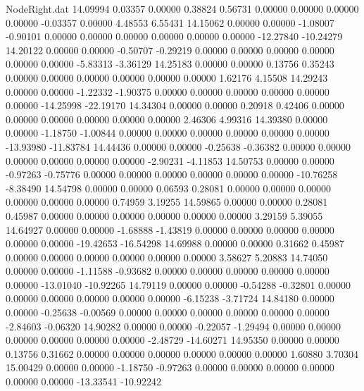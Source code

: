 \begin{filecontents}{NodeRight.dat}
  14.09994    0.03357    0.00000     0.38824    0.56731    0.00000    0.00000    0.00000    0.00000   -0.03357    0.00000    4.48553    6.55431
  14.15062    0.00000    0.00000    -1.08007   -0.90101    0.00000    0.00000    0.00000    0.00000    0.00000    0.00000  -12.27840  -10.24279
  14.20122    0.00000    0.00000    -0.50707   -0.29219    0.00000    0.00000    0.00000    0.00000    0.00000    0.00000   -5.83313   -3.36129
  14.25183    0.00000    0.00000     0.13756    0.35243    0.00000    0.00000    0.00000    0.00000    0.00000    0.00000    1.62176    4.15508
  14.29243    0.00000    0.00000    -1.22332   -1.90375    0.00000    0.00000    0.00000    0.00000    0.00000    0.00000  -14.25998  -22.19170
  14.34304    0.00000    0.00000     0.20918    0.42406    0.00000    0.00000    0.00000    0.00000    0.00000    0.00000    2.46306    4.99316
  14.39380    0.00000    0.00000    -1.18750   -1.00844    0.00000    0.00000    0.00000    0.00000    0.00000    0.00000  -13.93980  -11.83784
  14.44436    0.00000    0.00000    -0.25638   -0.36382    0.00000    0.00000    0.00000    0.00000    0.00000    0.00000   -2.90231   -4.11853
  14.50753    0.00000    0.00000    -0.97263   -0.75776    0.00000    0.00000    0.00000    0.00000    0.00000    0.00000  -10.76258   -8.38490
  14.54798    0.00000    0.00000     0.06593    0.28081    0.00000    0.00000    0.00000    0.00000    0.00000    0.00000    0.74959    3.19255
  14.59865    0.00000    0.00000     0.28081    0.45987    0.00000    0.00000    0.00000    0.00000    0.00000    0.00000    3.29159    5.39055
  14.64927    0.00000    0.00000    -1.68888   -1.43819    0.00000    0.00000    0.00000    0.00000    0.00000    0.00000  -19.42653  -16.54298
  14.69988    0.00000    0.00000     0.31662    0.45987    0.00000    0.00000    0.00000    0.00000    0.00000    0.00000    3.58627    5.20883
  14.74050    0.00000    0.00000    -1.11588   -0.93682    0.00000    0.00000    0.00000    0.00000    0.00000    0.00000  -13.01040  -10.92265
  14.79119    0.00000    0.00000    -0.54288   -0.32801    0.00000    0.00000    0.00000    0.00000    0.00000    0.00000   -6.15238   -3.71724
  14.84180    0.00000    0.00000    -0.25638   -0.00569    0.00000    0.00000    0.00000    0.00000    0.00000    0.00000   -2.84603   -0.06320
  14.90282    0.00000    0.00000    -0.22057   -1.29494    0.00000    0.00000    0.00000    0.00000    0.00000    0.00000   -2.48729  -14.60271
  14.95350    0.00000    0.00000     0.13756    0.31662    0.00000    0.00000    0.00000    0.00000    0.00000    0.00000    1.60880    3.70304
  15.00429    0.00000    0.00000    -1.18750   -0.97263    0.00000    0.00000    0.00000    0.00000    0.00000    0.00000  -13.33541  -10.92242

\end{filecontents}
